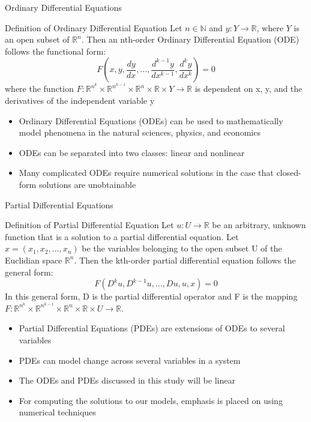 \documentclass[aspectratio=169,xcolor=dvipsnames]{beamer}
\begin{document}
\begin{frame}{Ordinary Differential Equations}
\begin{block}{Definition of Ordinary Differential Equation}
Let $n \in \mathbb{N}$ and $y:Y \rightarrow \mathbb{R}$, where $Y$ is an open subset of $\mathbb{R}^{n}$. Then an nth-order Ordinary Differential Equation (ODE) follows the functional form:
\begin{equation}
    F\left(x, y, \frac{dy}{dx},...,\frac{d^{k-1}y}{dx^{k-1}}, \frac{d^{k}y}{dx^{k}}\right)=0
    \label{eqn:ode_defn}
\end{equation}
where the function $F: \mathbb{R}^{n^{k}} \times \mathbb{R}^{n^{k-1}} \times \mathbb{R}^{n} \times \mathbb{R} \times Y \rightarrow \mathbb{R}$ is dependent on x, y, and the derivatives of the independent variable y
\end{block}
\begin{itemize}
    \item Ordinary Differential Equations (ODEs) can be used to mathematically model phenomena in the natural sciences, physics, and economics
    \item ODEs can be separated into two classes: linear and nonlinear
    \item Many complicated ODEs require numerical solutions in the case that closed-form solutions are unobtainable
\end{itemize}
\end{frame}

\begin{frame}{Partial Differential Equations}
\begin{block}{Definition of Partial Differential Equation}
Let $u: U\rightarrow \mathbb{R}$ be an arbitrary, unknown function that is a solution to a partial differential equation. Let $x=(x_1,x_2,...,x_n)$ be the variables belonging to the open subset U of the Euclidian space $\mathbb{R}^n$. Then the kth-order partial differential equation follows the general form:
\begin{equation}
    F(D^{k}u, D^{k-1}u,...,Du, u, x)=0
    \label{eqn:pde_defn}
\end{equation}
In this general form, D is the partial differential operator and F is the mapping $F: \mathbb{R}^{n^{k}} \times \mathbb{R}^{n^{k-1}} \times \mathbb{R}^{n} \times \mathbb{R} \times U \rightarrow \mathbb{R}$. 
\end{block}
\begin{itemize}
    \item Partial Differential Equations (PDEs) are extensions of ODEs to several variables
    \item PDEs can model change across several variables in a system
    \item The ODEs and PDEs discussed in this study will be linear
    \item For computing the solutions to our models, emphasis is placed on using numerical techniques
\end{itemize}
\end{frame}
\end{document}
